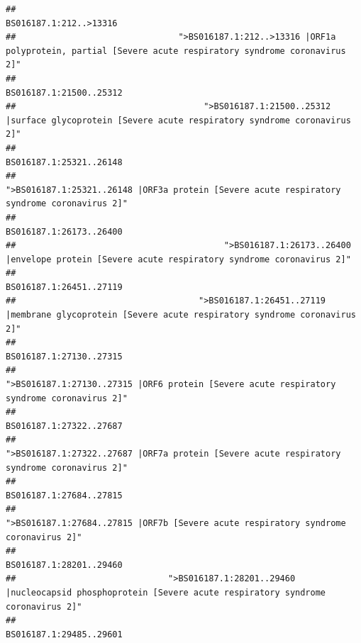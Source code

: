 \documentclass[
]{article}
\begin{document}
\begin{verbatim}
##                                                                                                                 BS016187.1:212..>13316 
##                                ">BS016187.1:212..>13316 |ORF1a polyprotein, partial [Severe acute respiratory syndrome coronavirus 2]" 
##                                                                                                                BS016187.1:21500..25312 
##                                     ">BS016187.1:21500..25312 |surface glycoprotein [Severe acute respiratory syndrome coronavirus 2]" 
##                                                                                                                BS016187.1:25321..26148 
##                                            ">BS016187.1:25321..26148 |ORF3a protein [Severe acute respiratory syndrome coronavirus 2]" 
##                                                                                                                BS016187.1:26173..26400 
##                                         ">BS016187.1:26173..26400 |envelope protein [Severe acute respiratory syndrome coronavirus 2]" 
##                                                                                                                BS016187.1:26451..27119 
##                                    ">BS016187.1:26451..27119 |membrane glycoprotein [Severe acute respiratory syndrome coronavirus 2]" 
##                                                                                                                BS016187.1:27130..27315 
##                                             ">BS016187.1:27130..27315 |ORF6 protein [Severe acute respiratory syndrome coronavirus 2]" 
##                                                                                                                BS016187.1:27322..27687 
##                                            ">BS016187.1:27322..27687 |ORF7a protein [Severe acute respiratory syndrome coronavirus 2]" 
##                                                                                                                BS016187.1:27684..27815 
##                                                    ">BS016187.1:27684..27815 |ORF7b [Severe acute respiratory syndrome coronavirus 2]" 
##                                                                                                                BS016187.1:28201..29460 
##                              ">BS016187.1:28201..29460 |nucleocapsid phosphoprotein [Severe acute respiratory syndrome coronavirus 2]" 
##                                                                                                                BS016187.1:29485..29601 

\end{verbatim}
\end{document}
